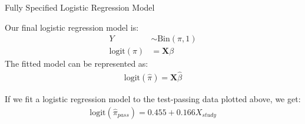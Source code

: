 \documentclass{beamer}\usepackage[]{graphicx}\usepackage[]{color}
\begin{document}

\begin{frame}{Fully Specified Logistic Regression Model}
  
  Our final logistic regression model is:
  \begin{align*}
    Y &\sim \text{Bin}(\pi, 1)\\
    \text{logit}(\pi) &= \mathbf{X} \beta
  \end{align*}
  The fitted model can be represented as:
  \begin{align*}
    \text{logit}(\hat{\pi}) = \mathbf{X} \hat{\beta}
  \end{align*}
  


If we fit a logistic regression model to the test-passing data plotted above, we 
get:
\begin{align*}
  \text{logit}(\hat{\pi}_{pass}) = 0.455 + 0.166 X_{study}
\end{align*}

\end{frame}
\end{document}
